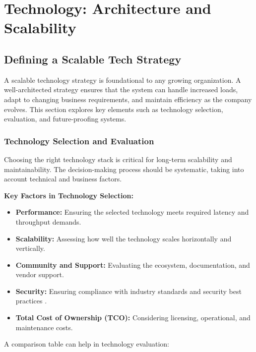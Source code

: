 \chapter{Technology: Architecture and Scalability}


\section{Defining a Scalable Tech Strategy}

A scalable technology strategy is foundational to any growing organization. A well-architected strategy ensures that the system can handle increased loads, adapt to changing business requirements, and maintain efficiency as the company evolves. This section explores key elements such as technology selection, evaluation, and future-proofing systems.

\subsection{Technology Selection and Evaluation}

Choosing the right technology stack is critical for long-term scalability and maintainability. The decision-making process should be systematic, taking into account technical and business factors.

\textbf{Key Factors in Technology Selection:}
\begin{itemize}
    \item \textbf{Performance:} Ensuring the selected technology meets required latency and throughput demands.
    \item \textbf{Scalability:} Assessing how well the technology scales horizontally and vertically.
    \item \textbf{Community and Support:} Evaluating the ecosystem, documentation, and vendor support.
    \item \textbf{Security:} Ensuring compliance with industry standards and security best practices .
    \item \textbf{Total Cost of Ownership (TCO):} Considering licensing, operational, and maintenance costs.
\end{itemize}

A comparison table can help in technology evaluation:


